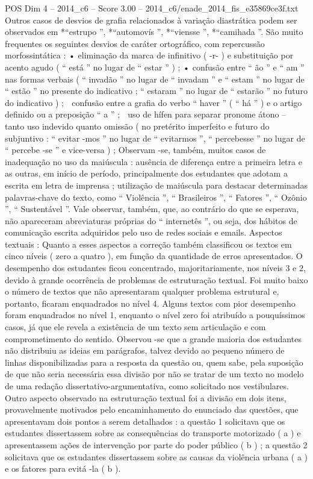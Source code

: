 \begin{textsample}{POS Dim 4 – 2014\_c6 – Score 3.00 – 2014\_c6/enade\_2014\_fis\_e35869ce3f.txt}
Outros casos de desvios de grafia relacionados à variação diastrática podem ser observados em *“estrupo ”, *“automovís ”, *“viensse ”, *“camihada ”.
São muito frequentes os seguintes desvios de caráter ortográfico, com repercussão morfossintática : • eliminação da marca de infinitivo ( -r- ) e substituição por acento agudo ( “ está ” no lugar de “ estar ” ) ; • confusão entre “ ão ” e “ am ” nas formas verbais ( “ invadão ” no lugar de “ invadam ” e “ estam ” no lugar de “ estão ” no presente do indicativo ; “ estaram ” no lugar de “ estarão ” no futuro do indicativo ) ;  confusão entre a grafia do verbo “ haver ” ( “ há ” ) e o artigo definido ou a preposição “ a ” ;  uso de hífen para separar pronome átono – tanto uso indevido quanto omissão ( no pretérito imperfeito e futuro do subjuntivo : “ evitar -mos ” no lugar de “ evitarmos ”, “ percebesse ” no lugar de “ percebe -se ” e vice-versa ) ; Observam -se, também, muitos casos de inadequação no uso da maiúscula : ausência de diferença entre a primeira letra e as outras, em início de período, principalmente dos estudantes que adotam a escrita em letra de imprensa ; utilização de maiúscula para destacar determinadas palavras-chave do texto, como “ Violência ”, “ Brasileiros ”, “ Fatores ”, “ Ozônio ”, “ Sustentável ”.
Vale observar, também, que, ao contrário do que se esperava, não apareceram abreviaturas próprias do “ internetês ”, ou seja, dos hábitos de comunicação escrita adquiridos pelo uso de redes sociais e emails.
Aspectos textuais : Quanto a esses aspectos a correção também classificou os textos em cinco níveis ( zero a quatro ), em função da quantidade de erros apresentados.
O desempenho dos estudantes ficou concentrado, majoritariamente, nos níveis 3 e 2, devido à grande ocorrência de problemas de estruturação textual.
Foi muito baixo o número de textos que não apresentaram qualquer problema estrutural e, portanto, ficaram enquadrados no nível 4.
Alguns textos com pior desempenho foram enquadrados no nível 1, enquanto o nível zero foi atribuído a pouquíssimos casos, já que ele revela a existência de um texto sem articulação e com comprometimento do sentido.
Observou -se que a grande maioria dos estudantes não distribuiu as ideias em parágrafos, talvez devido ao pequeno número de linhas disponibilizadas para a resposta da questão ou, quem sabe, pela suposição de que não seria necessária essa divisão por não se tratar de um texto no modelo de uma redação dissertativo-argumentativa, como solicitado nos vestibulares.
Outro aspecto observado na estruturação textual foi a divisão em dois itens, provavelmente motivados pelo encaminhamento do enunciado das questões, que apresentavam dois pontos a serem detalhados : a questão 1 solicitava que os estudantes dissertassem sobre as consequências do transporte motorizado ( a ) e apresentassem ações de intervenção por parte do poder público ( b ) ; a questão 2 solicitava que os estudantes dissertassem sobre as causas da violência urbana ( a ) e os fatores para evitá -la ( b ).

\end{textsample}
